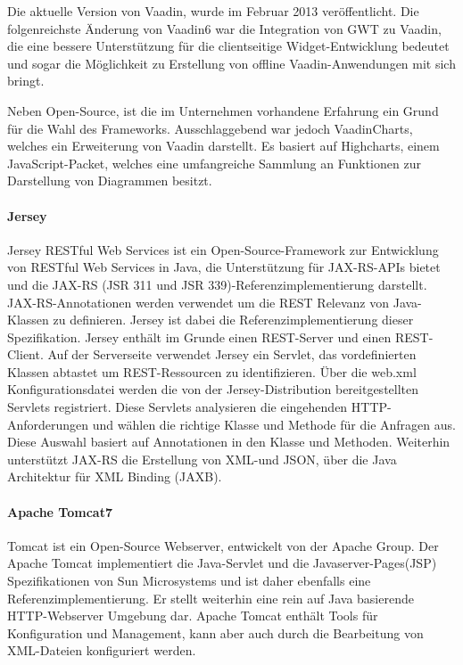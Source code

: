 Die aktuelle Version von Vaadin, wurde im Februar 2013 veröffentlicht. Die folgenreichste Änderung von Vaadin6 war die Integration von GWT zu Vaadin, die eine bessere Unterstützung für die clientseitige Widget-Entwicklung bedeutet und sogar die Möglichkeit zu Erstellung von offline Vaadin-Anwendungen mit sich bringt.

Neben Open-Source, ist die im Unternehmen vorhandene Erfahrung ein Grund für die Wahl des Frameworks. Ausschlaggebend war jedoch VaadinCharts, welches ein Erweiterung von Vaadin darstellt. Es basiert auf Highcharts, einem JavaScript-Packet, welches eine umfangreiche Sammlung an Funktionen zur Darstellung von Diagrammen besitzt. 

\paragraph{Jersey}

Jersey RESTful Web Services ist ein Open-Source-Framework zur Entwicklung von RESTful Web Services in Java, die Unterstützung für JAX-RS-APIs bietet und die JAX-RS (JSR 311 und JSR 339)-Referenzimplementierung darstellt. JAX-RS-Annotationen werden verwendet um die REST Relevanz von Java-Klassen zu definieren. Jersey ist dabei die Referenzimplementierung dieser Spezifikation. Jersey enthält im Grunde einen REST-Server und einen REST-Client. Auf der Serverseite verwendet Jersey ein Servlet, das vordefinierten Klassen abtastet um REST-Ressourcen zu identifizieren. Über die web.xml Konfigurationsdatei werden die von der Jersey-Distribution bereitgestellten Servlets registriert. Diese Servlets analysieren die eingehenden HTTP-Anforderungen und wählen die richtige Klasse und Methode für die Anfragen aus. Diese Auswahl basiert auf Annotationen in den Klasse und Methoden. Weiterhin unterstützt JAX-RS die Erstellung von XML-und JSON, über die Java Architektur für XML Binding (JAXB).

\paragraph{Apache Tomcat7}

Tomcat ist ein Open-Source Webserver, entwickelt von der Apache Group. Der Apache Tomcat implementiert die Java-Servlet und die Javaserver-Pages(JSP) Spezifikationen von Sun Microsystems und ist daher ebenfalls eine Referenzimplementierung. Er stellt weiterhin eine rein auf Java basierende HTTP-Webserver Umgebung dar. Apache Tomcat enthält Tools für Konfiguration und Management, kann aber auch durch die Bearbeitung von XML-Dateien konfiguriert werden.

